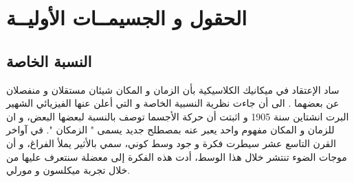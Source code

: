 \chapter{الحقول و الجسيمــات الأوليــة} %
\label{Chapter2}

\section{النسبة الخاصة}
ساد الإعتقاد في ميكانيك الكلاسيكية بأن الزمان و المكان شيئان مستقلان و منفصلان عن بعضهما . الى أن جاءت نظرية النسبية الخاصة و التي أعلن عنها الفيزيائي الشهير البرت انشتاين سنة 1905 و اثبتت أن حركة اﻷجسما توصف بالنسبة لبعضها البعض، و ان للزمان و المكان مفهوم واحد يعبر عنه بمصطلح جديد يسمى " الزمكان ". في آواخر القرن التاسع عشر سيطرت فكرة و جود وسط كوني، سمي باﻷثير يملأ الفراغ، و أن موجات الضوء تنتشر خلال هذا الوسط، أدت هذه الفكرة إلى معضلة سنتعرف عليها من خلال تجربة ميكلسون و مورلي.
